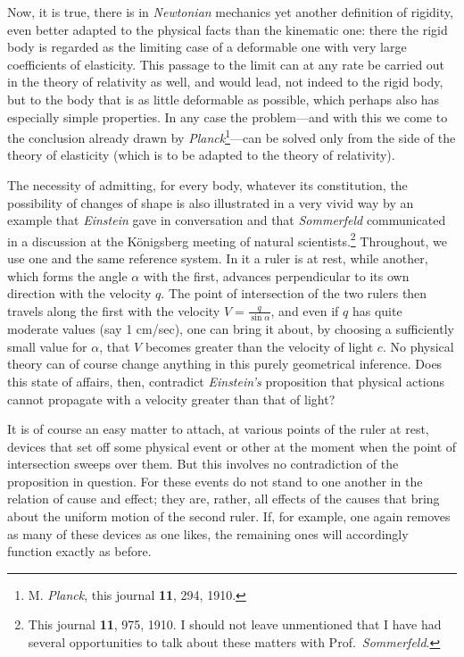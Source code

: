 \documentclass[12pt,a4paper]{article}
\newcommand{\opage}[1]{\marginnote{\footnotesize\textit{[#1]}}}
\begin{document}
Now, it is true, there is in \emph{Newtonian} mechanics yet another definition of rigidity, even better adapted to the physical facts than the kinematic one: there the rigid body is regarded as the limiting case of a deformable one with very large coefficients of elasticity.
This passage to the limit can at any rate be carried out in the theory of relativity as well, and would lead, not indeed to the rigid body, but to the body that is as little deformable as possible, which perhaps also has especially simple properties.
In any case the problem---and with this we come to the conclusion already drawn by \emph{Planck}\footnote[1]{M. \emph{Planck}, this journal \textbf{11}, 294, 1910.}---can be solved only from the side of the theory of elasticity (which is to be adapted to the theory of relativity).

The necessity of admitting, for every body, whatever its constitution, the possibility of changes of shape is also illustrated in a very vivid way by an example that \emph{Einstein} gave in conversation and that \emph{Sommerfeld} communicated in a discussion at the Königsberg meeting of natural scientists.\footnote[2]{This journal \textbf{11}, 975, 1910.
I should not leave unmentioned that I have had several opportunities to talk about these matters with Prof.\ \emph{Sommerfeld}.}
Throughout, we use one and the same reference system.
In it a ruler is at rest, while another, which forms the angle $\alpha$ with the first, advances perpendicular to its own direction with the velocity $q$.
The point of intersection of the two rulers then travels along the first with the velocity $V = \frac{q}{\sin\alpha}$, and even if $q$ has quite moderate values (say 1 cm/sec), one can bring it about, by choosing a sufficiently small value for $\alpha$, that $V$ becomes greater than the velocity of light $c$.
No physical theory can of course change anything in this purely geometrical inference.
Does this state of affairs, then, contradict \emph{Einstein's} proposition that physical actions cannot propagate with a velocity greater than that of light?

\opage{87}
It is of course an easy matter to attach, at various points of the ruler at rest, devices that set off some physical event or other at the moment when the point of intersection sweeps over them.
But this involves no contradiction of the proposition in question.
For these events do not stand to one another in the relation of cause and effect; they are, rather, all effects of the causes that bring about the uniform motion of the second ruler.
If, for example, one again removes as many of these devices as one likes, the remaining ones will accordingly function exactly as before.
\end{document}
